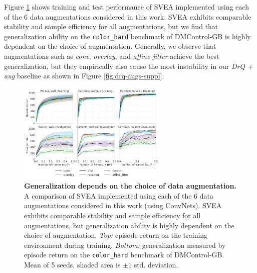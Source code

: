 Figure \ref{fig:dmc-svea-augs-generalization} shows training and test performance of SVEA implemented using each of the 6 data augmentations considered in this work. SVEA exhibits comparable stability and sample efficiency for all augmentations, but we find that generalization ability on the \texttt{color\_hard} benchmark of DMControl-GB is highly dependent on the choice of augmentation. Generally, we observe that augmentations such as \textit{conv}, \textit{overlay}, and \textit{affine-jitter} achieve the best generalization, but they empirically also cause the most instability in our \textit{DrQ + aug} baseline as shown in Figure \ref{fig:drq-augs-suppl}.
\begin{figure}[H]
    \centering
    \includegraphics[width=0.64\textwidth]{figures/svea_augs_generalization.pdf}
    \vspace{-0.05in}
    \caption{\textbf{Generalization depends on the choice of data augmentation.} A comparison of SVEA implemented using each of the 6 data augmentations considered in this work (using ConvNets). SVEA exhibits comparable stability and sample efficiency for all augmentations, but generalization ability is highly dependent on the choice of augmentation. \textit{Top:} episode return on the training environment during training. \textit{Bottom:} generalization measured by episode return on the \texttt{color\_hard} benchmark of DMControl-GB. Mean of 5 seeds, shaded area is $\pm1$ std. deviation.}
    \label{fig:dmc-svea-augs-generalization}
    \vspace{-0.1in}
\end{figure}